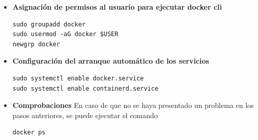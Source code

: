 \begin{itemize}
\begin{lstlisting}
docker-buildx-plugin docker-compose-plugin
\end{lstlisting}
    \item[§] \textbf{Asignación de permisos al usuario para ejecutar docker cli}
\begin{lstlisting}
sudo groupadd docker
sudo usermod -aG docker $USER
newgrp docker
\end{lstlisting}
    \item[§] \textbf{Configuración del arranque automático de los servicios}
\begin{lstlisting}
sudo systemctl enable docker.service
sudo systemctl enable containerd.service
\end{lstlisting}
    \item[§] \textbf{Comprobaciones}
    En caso de que no se haya presentado un problema en los pasos anteriores, se puede ejecutar el comando
\begin{lstlisting}
docker ps
\end{lstlisting}
\end{itemize}

